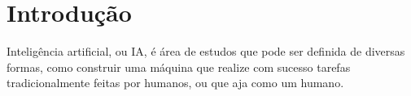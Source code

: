 \chapter{Introdução}
\label{cap:introducao}

Inteligência artificial, ou IA, é área de estudos que pode ser definida de diversas formas, como construir uma máquina que realize com sucesso tarefas tradicionalmente feitas por humanos, ou que aja como um humano.

%
%
%
%
%
